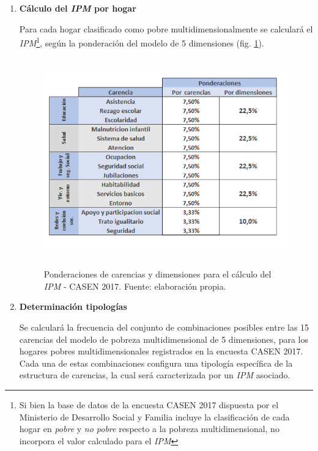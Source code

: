 \documentclass[12pt,letterpaper,spanish]{article}
\begin{document}
\begin{enumerate}
\item \textbf{Cálculo del \textit{IPM} por hogar}

Para cada hogar clasificado como pobre multidimensionalmente se calculará el \textit{IPM}\footnote{Si bien la base de datos de la encuesta CASEN 2017 dispuesta por el Ministerio de Desarrollo Social y Familia incluye la clasificación de cada hogar en \textit{pobre} y \textit{no pobre} respecto a la pobreza multidimensional, no incorpora el valor calculado para el \textit{IPM}}, según la ponderación del modelo de 5 dimensiones (fig. \ref{ponderaciones}).

\begin{figure}[H]
    \centering
    \includegraphics[height=9cm]{Max/ponderaciones.png}
    \caption{Ponderaciones de carencias y dimensiones para el cálculo del \textit{IPM} - CASEN 2017. Fuente: elaboración propia.}
    \label{ponderaciones}
\end{figure}

\vspace{2em}

\item \textbf{Determinación tipologías}


 Se calculará la frecuencia del conjunto de combinaciones posibles entre las 15 carencias del modelo de pobreza multidimensional de 5 dimensiones, para los hogares pobres multidimensionales registrados en la encuesta CASEN 2017. Cada una de estas combinaciones configura una tipología específica de la estructura de carencias, la cual será caracterizada por un \textit{IPM} asociado.
 
 \vspace{2em}


\end{enumerate}
\end{document}
